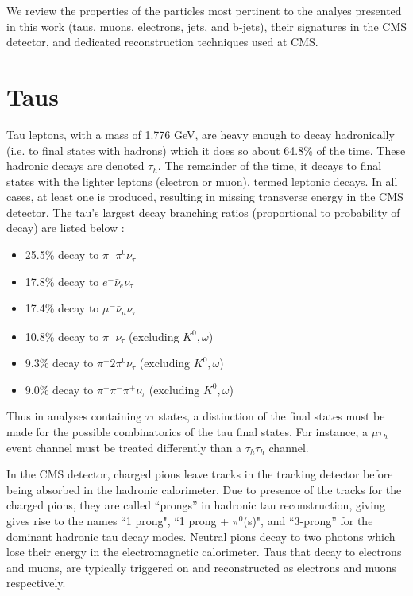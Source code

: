 We review the properties of the particles most pertinent to the analyes presented in this work (taus, muons, electrons, jets, and b-jets), their signatures in the CMS detector, and dedicated reconstruction techniques used at CMS.

\section{Taus}
Tau leptons, with a mass of 1.776 GeV, are heavy enough to decay hadronically (i.e. to final states with hadrons) which it does so about 64.8\% of the time. These hadronic decays are denoted $\tau_{h}$. The remainder of the time, it decays to final states with the lighter leptons (electron or muon), termed leptonic decays. In all cases, at least one is produced, resulting in missing transverse energy in the CMS detector. The tau's largest decay branching ratios (proportional to probability of decay) are listed below \citep{workman_review_2022}: 
\begin{itemize}
    \item 25.5\% decay to $\pi^- \pi^0 \nu_{\tau}$
    \item 17.8\% decay to $e^- \bar{\nu}_e \nu_{\tau}$
    \item 17.4\% decay to $\mu^- \bar{\nu}_\mu \nu_{\tau}$
    \item 10.8\% decay to $\pi^- \nu_{\tau}$ (excluding $K^0, \omega$)
    \item 9.3\% decay to $\pi^- 2\pi^0 \nu_{\tau}$ (excluding $K^0, \omega$)
    \item 9.0\% decay to $\pi^- \pi^- \pi^+ \nu_{\tau}$ (excluding $K^0, \omega$)
\end{itemize}

Thus in analyses containing $\tau\tau$ states, a distinction of the final states must be made for the possible combinatorics of the tau final states. For instance, a $\mu\tau_{h}$ event channel must be treated differently than a $\tau_{h}\tau_{h}$ channel.

In the CMS detector, charged pions leave tracks in the tracking detector before being absorbed in the hadronic calorimeter. Due to presence of the tracks for the charged pions, they are called ``prongs'' in hadronic tau reconstruction, giving gives rise to the names ``1 prong", ``1 prong + $\pi^0$(s)", and ``3-prong'' for the dominant hadronic tau decay modes. Neutral pions decay to two photons which lose their energy in the electromagnetic calorimeter. Taus that decay to electrons and muons, are typically triggered on and reconstructed as electrons and muons respectively. 

